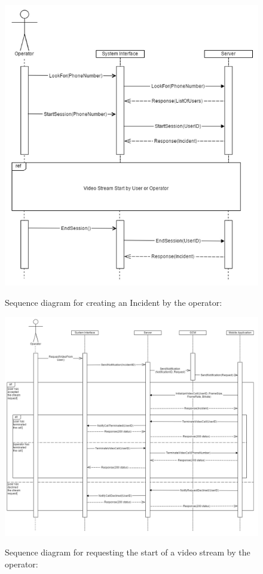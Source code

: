 \documentclass{article}
\begin{document}
	\begin{figure}[h]
		\centering
		\includegraphics[width=.9\textwidth]{"VideoStream/1"}

		Sequence diagram for creating an Incident by the operator:
	\end{figure} \clearpage
	
	
	\begin{figure}[h]
		\centering
		\includegraphics[width=.9\textwidth]{"VideoStream/2"}

		Sequence diagram for requesting the start of a video stream by the operator:
	\end{figure} \clearpage
	
\end{document}
